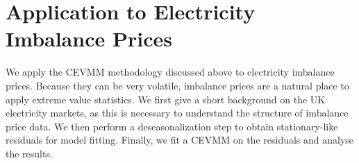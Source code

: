 \documentclass[11pt,twoside,openany]{book}
\newcommand{\prob}{\mathbb{P}}
\numberwithin{Theorem}{chapter}
\numberwithin{Definition}{chapter}
\numberwithin{Lemma}{chapter}
\numberwithin{Algorithm}{chapter}
\numberwithin{equation}{chapter}
\begin{document}







\clearpage
\section{Application to Electricity Imbalance Prices}

We apply the CEVMM methodology discussed above to electricity imbalance prices.
Because they can be very volatile, imbalance prices are a natural place to
apply extreme value statistics. We first give a short background on the UK
electricity markets, as this is necessary to understand the structure of
imbalance price data. We then perform a deseasonalization step to obtain
stationary-like residuals for model fitting. Finally, we fit a CEVMM on the
residuals and analyse the results.
\end{document}
